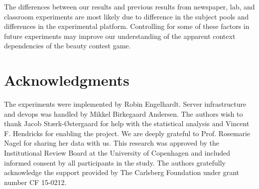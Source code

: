 \documentclass[12pt,review]{elsarticle}
\begin{document}
The differences between our results and previous results from newspaper, lab, and classroom experiments are most likely due to difference in the subject pools and differences in the experimental platform. Controlling for some of these factors in future experiments may improve our understanding of the apparent context dependencies of the beauty contest game.

\section{Acknowledgments}
\noindent
The experiments were implemented by Robin Engelhardt. Server infrastructure and devops was handled by Mikkel Birkegaard Andersen. The authors wish to thank Jacob Stærk-Østergaard for help with the statistical analysis and Vincent F. Hendricks for enabling the project. We are deeply grateful to Prof. Rosemarie Nagel for sharing her data with us. This research was approved by the Institutional Review Board at the University of Copenhagen and included informed consent by all participants in the study. The authors gratefully acknowledge the support provided by The Carlsberg Foundation under grant number CF 15-0212.

  
\newpage
\appendix
\setcounter{page}{1}

\end{document}
